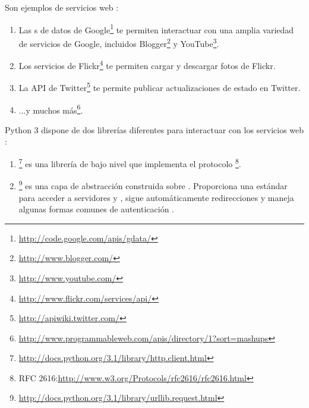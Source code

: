 Son ejemplos de servicios web :

\begin{enumerate}

\item Las s de datos de Google\footnote{\href{http://code.google.com/apis/gdata/}{http://code.google.com/apis/gdata/}} te permiten interactuar con una amplia variedad de servicios de Google, incluidos Blogger\footnote{\href{http://www.blogger.com/}{http://www.blogger.com/}} y YouTube\footnote{\href{http://www.youtube.com/}{http://www.youtube.com/}}.

\item Los servicios de Flickr\footnote{\href{http://www.flickr.com/services/api/}{http://www.flickr.com/services/api/}} te permiten cargar y descargar fotos de Flickr.

\item La API de Twitter\footnote{\href{http://apiwiki.twitter.com/}{http://apiwiki.twitter.com/}} te permite publicar actualizaciones de estado en Twitter.

\item ...y muchos más\footnote{\href{http://www.programmableweb.com/apis/directory/1?sort=mashups}{http://www.programmableweb.com/apis/directory/1?sort=mashups}}.

\end{enumerate}

Python 3 dispone de dos librerías diferentes para interactuar con los servicios web :

\begin{enumerate}

\item {}\footnote{\href{http://docs.python.org/3.1/library/http.client.html}{http://docs.python.org/3.1/library/http.client.html}} es una librería de bajo nivel que implementa el protocolo \footnote{RFC 2616:\href{http://www.w3.org/Protocols/rfc2616/rfc2616.html}{http://www.w3.org/Protocols/rfc2616/rfc2616.html}}.

\item {}\footnote{\href{http://docs.python.org/3.1/library/urllib.request.html}{http://docs.python.org/3.1/library/urllib.request.html}} es una capa de abstracción construida sobre . Proporciona una  estándar para acceder a servidores  y , sigue automáticamente redirecciones  y maneja algunas formas comunes de autenticación .

\end{enumerate}

